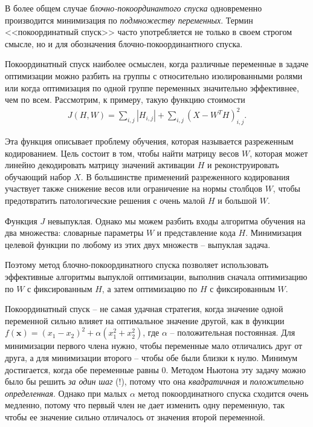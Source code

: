 \documentclass[%
	11pt,
	a4paper,
	utf8,
]{article}
\begin{document}
В более общем случае \emph{блочно-покоординантого спуска} одновременно производится минимизация по \emph{подмножеству переменных}. Термин <<покоординатный спуск>> часто употребляется не только в своем строгом смысле, но и для обозначения блочно-покоординантного спуска.

Покоординатный спуск наиболее осмыслен, когда различные переменные в задаче оптимизации можно разбить на группы с относительно изолированными ролями или когда оптимизация по одной группе переменных значительно эффективнее, чем по всем. Рассмотрим, к примеру, такую функцию стоимости
\begin{align*}
	J(H, W) = \sum_{i,j} | H_{i, j} | + \sum_{i, j} (X - W^T H)^2_{i, j}.
\end{align*}

Эта функция описывает проблему обучения, которая называется разреженным кодированием. Цель состоит в том, чтобы найти матрицу весов $ W $, которая может линейно декодировать матрицу значений активации $ H $ и реконструировать обучающий набор $ X $. В большинстве применений разреженного кодирования участвует также снижение весов или ограничение на нормы столбцов $ W $, чтобы предотвратить патологические решения с очень малой $ H $ и большой $ W $.

Функция $ J $ невыпуклая. Однако мы можем разбить входы алгоритма обучения на два множества: словарные параметры $ W $ и представление кода $ H $. Минимизация целевой функции по любому из этих двух множеств -- выпуклая задача. 

Поэтому метод блочно-покоординатного спуска позволяет использовать эффективные алгоритмы выпуклой оптимизации, выполнив сначала оптимизацию по $ W $ с фиксированным $ H $, а затем оптимизацию по $ H $ с фиксированным $ W $.

Покоординатный спуск -- не самая удачная стратегия, когда значение одной переменной сильно влияет на оптимальное значение другой, как в функции $ f(\mathbf{x}) = (x_1 - x_2)^2 +\alpha (x_1^2 +x_2^2)$, где $ \alpha $ -- положительная постоянная. Для минимизации первого члена нужно, чтобы переменные мало отличались друг от друга, а для минимизации второго -- чтобы обе были близки к нулю. Минимум достигается, когда обе переменные равны 0.  Методом Ньютона эту задачу можно было бы решить \emph{за один шаг} (!), потому что она \emph{квадратичная} и \emph{положительно определенная}. Однако при малых $ \alpha $ метод покоординатного спуска сходится очень медленно, потому что первый член не дает изменить одну переменную, так чтобы ее значение сильно отличалось от значения второй переменной.
\end{document}
